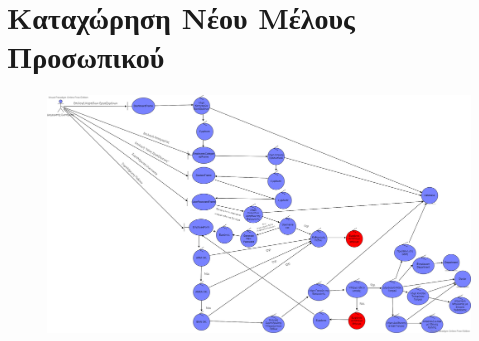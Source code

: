 \documentclass{article}
\begin{document}
\newpage

\section{Καταχώρηση Νέου Μέλους Προσωπικού}

\vspace{0.2cm}

\begin{figure}[!htb]
        \centering
        \includegraphics[width=1.1\textwidth]{Employee Insertion.png}
\end{figure}
\end{document}
